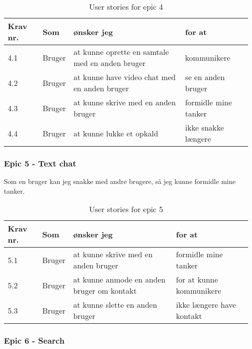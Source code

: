\begin{table}[H]
    \centering
    \caption{User stories for epic 4}
    \label{tab:us-epic4}
    \begin{tabular}{l|l|l|l}
        \textbf{Krav nr.} & \textbf{Som} & \textbf{ønsker jeg}                             & \textbf{for at}      \\
        \hline
        4.1               & Bruger       & at kunne oprette en samtale med en anden bruger & kommunikere          \\
        \hline
        4.2               & Bruger       & at kunne have video chat med en anden bruger    & se en anden bruger   \\
        \hline
        4.3               & Bruger       & at kunne skrive med en anden bruger             & formidle mine tanker \\
        \hline
        4.4               & Bruger       & at kunne lukke et opkald                        & ikke snakke længere  \\
    \end{tabular}
\end{table}

\subsubsection{Epic 5 - Text chat}

Som en bruger kan jeg snakke med andre brugere, så jeg kunne formidle mine tanker.

\begin{table}[H]
    \centering
    \caption{User stories for epic 5}
    \label{tab:us-epic5}
    \begin{tabular}{l|l|l|l}
        \textbf{Krav nr.} & \textbf{Som} & \textbf{ønsker jeg}                        & \textbf{for at}           \\
        \hline
        5.1               & Bruger       & at kunne skrive med en anden bruger        & formidle mine tanker      \\
        \hline
        5.2               & Bruger       & at kunne anmode en anden bruger om kontakt & for at kunne kommunikere  \\
        \hline
        5.3               & Bruger       & at kunne slette en anden bruger            & ikke længere have kontakt \\
    \end{tabular}
\end{table}

\subsubsection{Epic 6 - Search}

